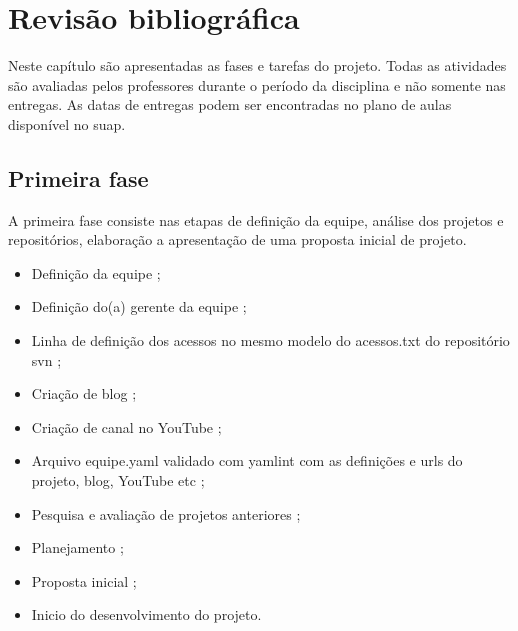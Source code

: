 \chapter{Revisão bibliográfica}
\label{fases-da-disciplina}
Neste capítulo são apresentadas as fases e tarefas do projeto. Todas as atividades são avaliadas pelos professores durante o período da disciplina e não somente nas entregas. 
As datas de entregas podem ser encontradas no plano de aulas disponível no \ac{suap}.



\section{Primeira fase}
A primeira fase consiste nas etapas de definição da equipe, análise dos projetos e repositórios, elaboração a apresentação de uma proposta inicial de projeto. 

\begin{itemize}
    \item Definição da equipe ;
    
    \item Definição do(a) gerente da equipe ;
    
    \item Linha de definição dos acessos no mesmo modelo do acessos.txt do repositório \gls{svn} ;
    
    \item Criação de blog ;
    
    \item Criação de canal no YouTube ;
    
    \item Arquivo equipe.yaml validado com yamlint com as definições e urls do projeto, blog, YouTube etc ;
    
    \item Pesquisa e avaliação de projetos anteriores ;
    
    \item Planejamento ;
    
    \item Proposta inicial ;
    
    \item Inicio do desenvolvimento do projeto.
\end{itemize}


